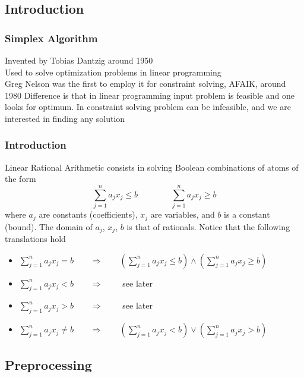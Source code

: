 \subsection{Introduction}

\begin{frame}
  \frametitle{Simplex Algorithm}

  Invented by Tobias Dantzig around 1950 \\
  \vfill
  Used to solve optimization problems in linear programming \\
  \vfill
  Greg Nelson was the first to employ it for 
  constraint solving, AFAIK, around 1980
  \vfill
  Difference is that in linear programming input problem is
  feasible and one looks for optimum. In constraint solving
  problem can be infeasible, and we are interested in 
  finding any solution

\end{frame}

\begin{frame}
  \frametitle{Introduction}

Linear Rational Arithmetic \Lra consists in solving
Boolean combinations of atoms of the form
$$
\sum_{j=1}^n a_j x_j \leq b\quad\quad\quad\quad\sum_{j=1}^n a_j x_j \geq b
$$
where $a_j$ are constants (coefficients), $x_j$ are
variables, and $b$ is a constant (bound). The domain
of $a_j$, $x_j$, $b$ is that of rationals.
\vfill
\pause
Notice that the following translations hold
\begin{itemize}
  \item $\sum_{j=1}^n a_j x_j = b     \quad\quad\Longrightarrow\quad\quad  (\sum_{j=1}^n a_j x_j \leq  b) \wedge (\sum_{j=1}^n a_j x_j \geq b)$  
  \item $\sum_{j=1}^n a_j x_j < b     \quad\quad\Longrightarrow\quad\quad$ see later
  \item $\sum_{j=1}^n a_j x_j > b     \quad\quad\Longrightarrow\quad\quad$ see later 
  \item $\sum_{j=1}^n a_j x_j \not= b \quad\quad\Longrightarrow\quad\quad  (\sum_{j=1}^n a_j x_j < b) \vee (\sum_{j=1}^n a_j x_j > b)$  
\end{itemize}

\end{frame}

\subsection{Preprocessing}

